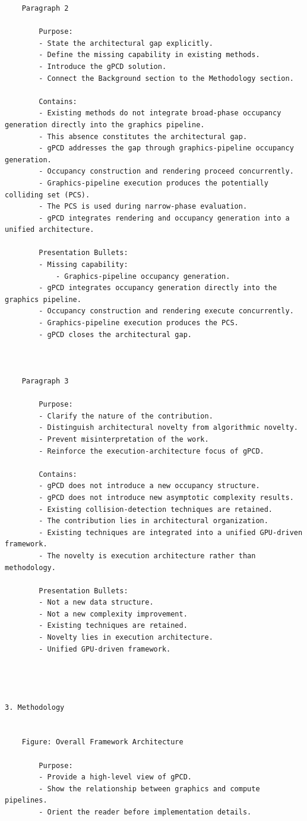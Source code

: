 \begin{verbatim}
	Paragraph 2

		Purpose:
		- State the architectural gap explicitly.
		- Define the missing capability in existing methods.
		- Introduce the gPCD solution.
		- Connect the Background section to the Methodology section.

		Contains:
		- Existing methods do not integrate broad-phase occupancy generation directly into the graphics pipeline.
		- This absence constitutes the architectural gap.
		- gPCD addresses the gap through graphics-pipeline occupancy generation.
		- Occupancy construction and rendering proceed concurrently.
		- Graphics-pipeline execution produces the potentially colliding set (PCS).
		- The PCS is used during narrow-phase evaluation.
		- gPCD integrates rendering and occupancy generation into a unified architecture.

		Presentation Bullets:
		- Missing capability:
			- Graphics-pipeline occupancy generation.
		- gPCD integrates occupancy generation directly into the graphics pipeline.
		- Occupancy construction and rendering execute concurrently.
		- Graphics-pipeline execution produces the PCS.
		- gPCD closes the architectural gap.



	Paragraph 3

		Purpose:
		- Clarify the nature of the contribution.
		- Distinguish architectural novelty from algorithmic novelty.
		- Prevent misinterpretation of the work.
		- Reinforce the execution-architecture focus of gPCD.

		Contains:
		- gPCD does not introduce a new occupancy structure.
		- gPCD does not introduce new asymptotic complexity results.
		- Existing collision-detection techniques are retained.
		- The contribution lies in architectural organization.
		- Existing techniques are integrated into a unified GPU-driven framework.
		- The novelty is execution architecture rather than methodology.

		Presentation Bullets:
		- Not a new data structure.
		- Not a new complexity improvement.
		- Existing techniques are retained.
		- Novelty lies in execution architecture.
		- Unified GPU-driven framework.



   
3. Methodology


	Figure: Overall Framework Architecture

		Purpose:
		- Provide a high-level view of gPCD.
		- Show the relationship between graphics and compute pipelines.
		- Orient the reader before implementation details.


\end{verbatim}
